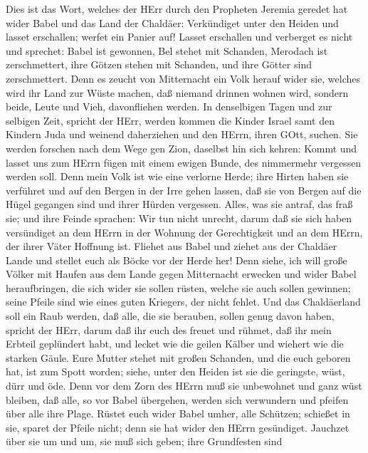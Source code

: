  Dies ist das Wort, welches der HErr durch den Propheten
Jeremia geredet hat wider Babel und das Land der Chaldäer: 
Verkündiget unter den Heiden und lasset erschallen; werfet ein Panier
auf! Lasset erschallen und verberget es nicht und sprechet: Babel ist
gewonnen, Bel stehet mit Schanden, Merodach ist zerschmettert, ihre
Götzen stehen mit Schanden, und ihre Götter sind zerschmettert.
 Denn es zeucht von Mitternacht ein Volk herauf wider sie,
welches wird ihr Land zur Wüste machen, daß niemand drinnen wohnen wird,
sondern beide, Leute und Vieh, davonfliehen werden.  In
denselbigen Tagen und zur selbigen Zeit, spricht der HErr, werden kommen
die Kinder Israel samt den Kindern Juda und weinend daherziehen und den
HErrn, ihren GOtt, suchen.  Sie werden forschen nach dem
Wege gen Zion, daselbst hin sich kehren: Kommt und lasset uns zum HErrn
fügen mit einem ewigen Bunde, des nimmermehr vergessen werden soll.
 Denn mein Volk ist wie eine verlorne Herde; ihre Hirten
haben sie verführet und auf den Bergen in der Irre gehen lassen, daß sie
von Bergen auf die Hügel gegangen sind und ihrer Hürden vergessen.
 Alles, was sie antraf, das fraß sie; und ihre Feinde
sprachen: Wir tun nicht unrecht, darum daß sie sich haben versündiget an
dem HErrn in der Wohnung der Gerechtigkeit und an dem HErrn, der ihrer
Väter Hoffnung ist.  Fliehet aus Babel und ziehet aus der
Chaldäer Lande und stellet euch als Böcke vor der Herde her!
 Denn siehe, ich will große Völker mit Haufen aus dem Lande
gegen Mitternacht erwecken und wider Babel heraufbringen, die sich wider
sie sollen rüsten, welche sie auch sollen gewinnen; seine Pfeile sind
wie eines guten Kriegers, der nicht fehlet.  Und das
Chaldäerland soll ein Raub werden, daß alle, die sie berauben, sollen
genug davon haben, spricht der HErr,  darum daß ihr euch
des freuet und rühmet, daß ihr mein Erbteil geplündert habt, und lecket
wie die geilen Kälber und wiehert wie die starken Gäule. 
Eure Mutter stehet mit großen Schanden, und die euch geboren hat, ist
zum Spott worden; siehe, unter den Heiden ist sie die geringste, wüst,
dürr und öde.  Denn vor dem Zorn des HErrn muß sie
unbewohnet und ganz wüst bleiben, daß alle, so vor Babel übergehen,
werden sich verwundern und pfeifen über alle ihre Plage. 
Rüstet euch wider Babel umher, alle Schützen; schießet in sie, sparet
der Pfeile nicht; denn sie hat wider den HErrn gesündiget. 
Jauchzet über sie um und um, sie muß sich geben; ihre Grundfesten sind
